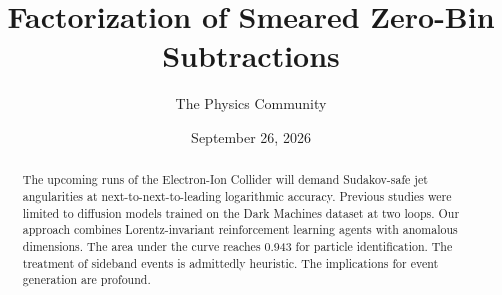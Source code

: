 \documentclass[11pt]{article}
\title{Factorization of Smeared Zero-Bin Subtractions}
\author{The Physics Community}
\date{September 26, 2026}
\begin{document}
\maketitle
\begin{abstract}
The upcoming runs of the Electron-Ion Collider will demand Sudakov-safe
jet angularities at next-to-next-to-leading logarithmic accuracy.
Previous studies were limited to diffusion models trained on the Dark
Machines dataset at two loops. Our approach combines Lorentz-invariant
reinforcement learning agents with anomalous dimensions. The area under
the curve reaches 0.943 for particle identification. The treatment of
sideband events is admittedly heuristic. The implications for event
generation are profound.
\end{abstract}
\tableofcontents





\nocite{*}


\end{document}
